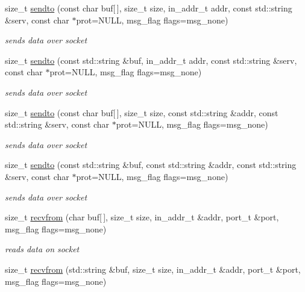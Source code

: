 \begin{CompactItemize}
\begin{CompactItemize}
size\_\-t \hyperlink{classsocketpp_1_1BaseSocket_66dd5d38b741346d3b37cff6d26e7b8c}{sendto} (const char buf\mbox{[}$\,$\mbox{]}, size\_\-t size, in\_\-addr\_\-t addr, const std::string \&serv, const char $\ast$prot=NULL, msg\_\-flag flags=msg\_\-none)
\begin{CompactList}\small\item\em sends data over socket \item\end{CompactList}\item 
size\_\-t \hyperlink{classsocketpp_1_1BaseSocket_d3b26301f9af47aa8bdcf38c32ba8c9d}{sendto} (const std::string \&buf, in\_\-addr\_\-t addr, const std::string \&serv, const char $\ast$prot=NULL, msg\_\-flag flags=msg\_\-none)
\begin{CompactList}\small\item\em sends data over socket \item\end{CompactList}\item 
size\_\-t \hyperlink{classsocketpp_1_1BaseSocket_31b240c268f150718c7411da62efff7d}{sendto} (const char buf\mbox{[}$\,$\mbox{]}, size\_\-t size, const std::string \&addr, const std::string \&serv, const char $\ast$prot=NULL, msg\_\-flag flags=msg\_\-none)
\begin{CompactList}\small\item\em sends data over socket \item\end{CompactList}\item 
size\_\-t \hyperlink{classsocketpp_1_1BaseSocket_f3e7f526290cc37aeaaa1f6686c17ee3}{sendto} (const std::string \&buf, const std::string \&addr, const std::string \&serv, const char $\ast$prot=NULL, msg\_\-flag flags=msg\_\-none)
\begin{CompactList}\small\item\em sends data over socket \item\end{CompactList}\item 
size\_\-t \hyperlink{classsocketpp_1_1BaseSocket_6a207860c0a1328dc05bea32bb62e81f}{recvfrom} (char buf\mbox{[}$\,$\mbox{]}, size\_\-t size, in\_\-addr\_\-t \&addr, port\_\-t \&port, msg\_\-flag flags=msg\_\-none)
\begin{CompactList}\small\item\em reads data on socket \item\end{CompactList}\item 
size\_\-t \hyperlink{classsocketpp_1_1BaseSocket_8241347ca77942e2bb1449d117ac7248}{recvfrom} (std::string \&buf, size\_\-t size, in\_\-addr\_\-t \&addr, port\_\-t \&port, msg\_\-flag flags=msg\_\-none)

\end{CompactItemize}
\end{CompactItemize}
